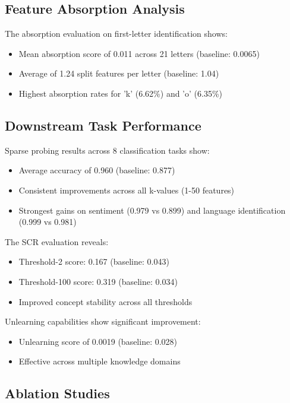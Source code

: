 \documentclass{article} %
\begin{document}
\subsection{Feature Absorption Analysis}

The absorption evaluation on first-letter identification shows:
\begin{itemize}
\item Mean absorption score of 0.011 across 21 letters (baseline: 0.0065)
\item Average of 1.24 split features per letter (baseline: 1.04)
\item Highest absorption rates for 'k' (6.62\%) and 'o' (6.35\%)
\end{itemize}

\subsection{Downstream Task Performance}

Sparse probing results across 8 classification tasks show:
\begin{itemize}
\item Average accuracy of 0.960 (baseline: 0.877)
\item Consistent improvements across all k-values (1-50 features)
\item Strongest gains on sentiment (0.979 vs 0.899) and language identification (0.999 vs 0.981)
\end{itemize}

The SCR evaluation reveals:
\begin{itemize}
\item Threshold-2 score: 0.167 (baseline: 0.043)
\item Threshold-100 score: 0.319 (baseline: 0.034)
\item Improved concept stability across all thresholds
\end{itemize}

Unlearning capabilities show significant improvement:
\begin{itemize}
\item Unlearning score of 0.0019 (baseline: 0.028)
\item Effective across multiple knowledge domains
\end{itemize}

\subsection{Ablation Studies}
\end{document}
